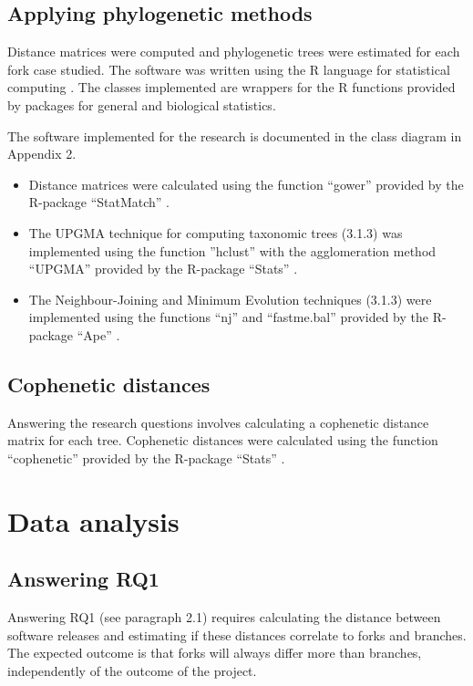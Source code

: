 

\subsection{Applying phylogenetic methods}
Distance matrices were computed and phylogenetic trees were estimated for each fork case studied. The software was written using the R language for statistical computing \citep{RDevelopmentCoreTeam2008a}. The classes implemented are wrappers for the R functions provided by packages for general and biological statistics. 

The software implemented for the research is documented in the class diagram in Appendix 2.

\begin{itemize}
\item{Distance matrices were calculated using the function “gower” provided by the R-package “StatMatch” \citep{DOrazio2016}.}

\item{The UPGMA technique for computing taxonomic trees (3.1.3) was implemented using the function ”hclust” with the agglomeration method “UPGMA” provided by the R-package “Stats” \citep[p.1355]{RDevelopmentCoreTeam2008a}.}

\item{The Neighbour-Joining and Minimum Evolution techniques (3.1.3) were implemented using the functions “nj” and “fastme.bal” provided by the R-package “Ape” \citep{Paradis2004a}.}
\end{itemize}

\subsection{Cophenetic distances}
Answering the research questions involves calculating a cophenetic distance matrix for each tree. Cophenetic distances were calculated using the function “cophenetic” provided by the R-package “Stats” \citep[p.1275]{RDevelopmentCoreTeam2008a}.


\section{Data analysis}

\subsection{Answering RQ1}
Answering RQ1 (see paragraph 2.1) requires calculating the distance between software releases and estimating if these distances correlate to forks and branches. The expected outcome is that forks will always differ more than branches, independently of the outcome of the project.

